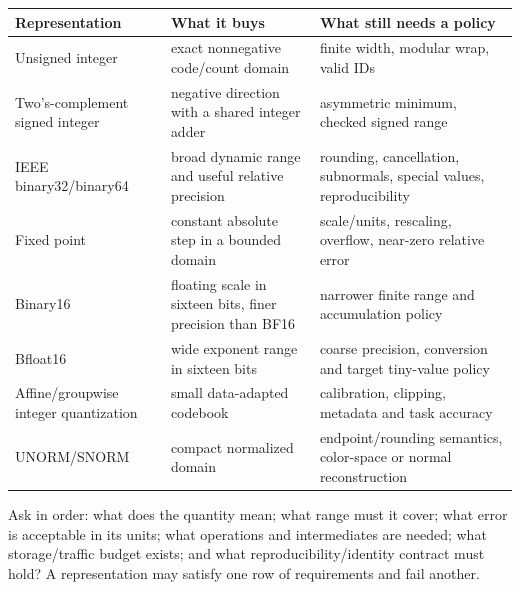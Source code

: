 {\def\LTcaptype{none} %
\begin{longtable}[]{@{}
  >{\raggedright\arraybackslash}p{}
  >{\raggedright\arraybackslash}p{}
  >{\raggedright\arraybackslash}p{}@{}}
\toprule\noalign{}
\begin{minipage}[b]{\linewidth}\raggedright
Representation
\end{minipage} & \begin{minipage}[b]{\linewidth}\raggedright
What it buys
\end{minipage} & \begin{minipage}[b]{\linewidth}\raggedright
What still needs a policy
\end{minipage} \\
\midrule\noalign{}
\endhead
\bottomrule\noalign{}
\endlastfoot
Unsigned integer & exact nonnegative code/count domain & finite width, modular wrap, valid IDs \\
Two's-complement signed integer & negative direction with a shared integer adder & asymmetric minimum, checked signed range \\
IEEE binary32/binary64 & broad dynamic range and useful relative precision & rounding, cancellation, subnormals, special values, reproducibility \\
Fixed point & constant absolute step in a bounded domain & scale/units, rescaling, overflow, near-zero relative error \\
Binary16 & floating scale in sixteen bits, finer precision than BF16 & narrower finite range and accumulation policy \\
Bfloat16 & wide exponent range in sixteen bits & coarse precision, conversion and target tiny-value policy \\
Affine/groupwise integer quantization & small data-adapted codebook & calibration, clipping, metadata and task accuracy \\
UNORM/SNORM & compact normalized domain & endpoint/rounding semantics, color-space or normal reconstruction \\
\end{longtable}
}

Ask in order: what does the quantity mean; what range must it cover; what error is acceptable in its units; what operations and intermediates are needed; what storage/traffic budget exists; and what reproducibility/identity contract must hold? A representation may satisfy one row of requirements and fail another.

